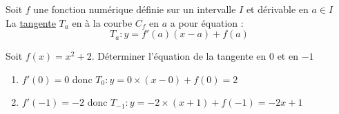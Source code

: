 \documentclass[12pt]{article}
\begin{document}
\begin{propriete}
   Soit $f$ une fonction numérique définie sur un intervalle $I$ et dérivable en $a\in I$\\
La \underline{tangente} $T_a$ en à la courbe $C_f$ en $a$ a pour équation :
$$T_a : y=f'(a)(x-a)+f(a)$$
\end{propriete}

\begin{exemple}
   Soit $f(x)=x^2+2$. Déterminer l'équation de la tangente en $0$ et en $-1$
   \begin{enumerate}
      \item $f'(0)=0$ donc $T_0 : y=0\times(x-0)+f(0)=2$
      \item $f'(-1)=-2$ donc $T_{-1} : y=-2\times(x+1)+f(-1)=-2x+1$
   \end{enumerate}
\end{exemple}
\end{document}
